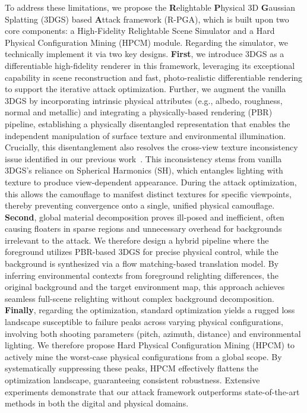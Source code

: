 \documentclass[10pt,journal,compsoc]{IEEEtran}
\begin{document}
To address these limitations, we propose the \textbf{R}elightable \textbf{P}hysical 3D \textbf{G}aussian Splatting (3DGS) based \textbf{A}ttack framework (R-PGA), which is built upon two core components: a High-Fidelity Relightable Scene Simulator and a Hard Physical Configuration Mining (HPCM) module.
Regarding the simulator, we technically implement it via two key designs. \textbf{First}, we introduce 3DGS as a differentiable high-fidelity renderer in this framework, leveraging its exceptional capability in scene reconstruction and fast, photo-realistic differentiable rendering to support the iterative attack optimization.
Further, we augment the vanilla 3DGS by incorporating intrinsic physical attributes (e.g., albedo, roughness, normal and metallic) and integrating a physically-based rendering (PBR) pipeline, establishing a physically disentangled representation that enables the independent manipulation of surface texture and environmental illumination. 
Crucially, this disentanglement also resolves the cross-view texture inconsistency issue identified in our previous work~\cite{lou2025pga}. 
This inconsistency stems from vanilla 3DGS's reliance on Spherical Harmonics (SH), which entangles lighting with texture to produce view-dependent appearance. 
During the attack optimization, this allows the camouflage to manifest distinct textures for specific viewpoints, thereby preventing convergence onto a single, unified physical camouflage.
\textbf{Second}, global material decomposition proves ill-posed and inefficient, often causing floaters in sparse regions and unnecessary overhead for backgrounds irrelevant to the attack.
We therefore design a hybrid pipeline where the foreground utilizes PBR-based 3DGS for precise physical control, while the background is synthesized via a flow matching-based translation model. 
By inferring environmental contexts from foreground relighting differences, the original background and the target environment map, this approach achieves seamless full-scene relighting without complex background decomposition.
\textbf{Finally}, regarding the optimization, standard optimization yields a rugged loss landscape susceptible to failure peaks across varying physical configurations, involving both shooting parameters (pitch, azimuth, distance) and environmental lighting.
We therefore propose Hard Physical Configuration Mining (HPCM) to actively mine the worst-case physical configurations from a global scope. 
By systematically suppressing these peaks, HPCM effectively flattens the optimization landscape, guaranteeing consistent robustness.
Extensive experiments demonstrate that our attack framework outperforms state-of-the-art methods in both the digital and physical domains. 
\end{document}
